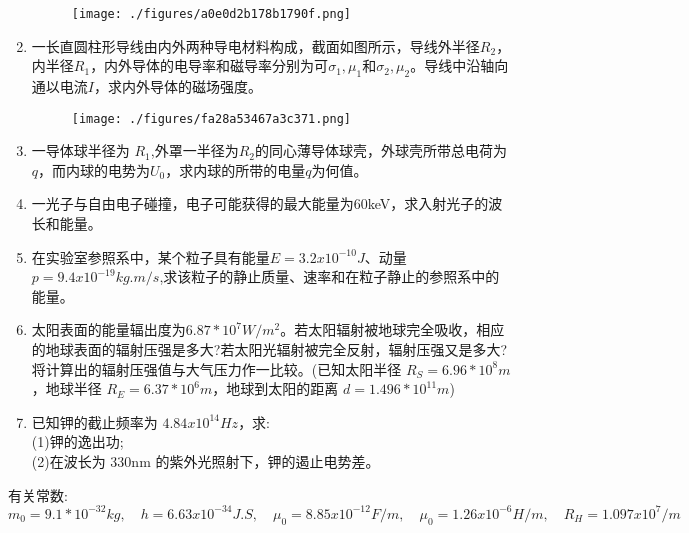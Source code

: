 \begin{enumerate}
\begin{figure}[ht]
\centering
\texttt{[image: ./figures/a0e0d2b178b1790f.png]}
\caption{} \label{fig_SD11_2}
\end{figure}
\item 一长直圆柱形导线由内外两种导电材料构成，截面如图所示，导线外半径$R_2$，内半径$R_1$，内外导体的电导率和磁导率分别为可$\sigma_1,\mu_1$和$\sigma_2,\mu_2$。导线中沿轴向通以电流$I$，求内外导体的磁场强度。
\begin{figure}[ht]
\centering
\texttt{[image: ./figures/fa28a53467a3c371.png]}
\caption{} \label{fig_SD11_1}
\end{figure}
\item 一导体球半径为 $R_1$,外罩一半径为$ R_2$的同心薄导体球壳，外球壳所带总电荷为$q$，而内球的电势为$ U_0$，求内球的所带的电量$ q$为何值。
\item 一光子与自由电子碰撞，电子可能获得的最大能量为60keV，求入射光子的波长和能量。
\item 在实验室参照系中，某个粒子具有能量$E=3.2x10^{-10}J$、动量$p=9.4x10^{-19}kg.m/s$,求该粒子的静止质量、速率和在粒子静止的参照系中的能量。
\item 太阳表面的能量辐出度为$6.87*10^7 W/m^2$。若太阳辐射被地球完全吸收，相应的地球表面的辐射压强是多大?若太阳光辐射被完全反射，辐射压强又是多大?将计算出的辐射压强值与大气压力作一比较。(已知太阳半径 $R_S=6.96*10^8m$，地球半径 $R_E=6.37*10^6m$，地球到太阳的距离 $d=1.496*10^{11}m$)
\item 已知钾的截止频率为 $4.84x10^{14}Hz$，求:\\
(1)钾的逸出功;\\
(2)在波长为 330nm 的紫外光照射下，钾的遏止电势差。




\end{enumerate}
有关常数:$m_0=9.1*10^{-32}kg,\quad h=6.63x10^{-34}J.S,\quad \mu_0=8.85x10^{-12}F/m,\quad \mu_0=1.26x10^{-6} H/m,
\quad R_H=1.097x10^7/m$
